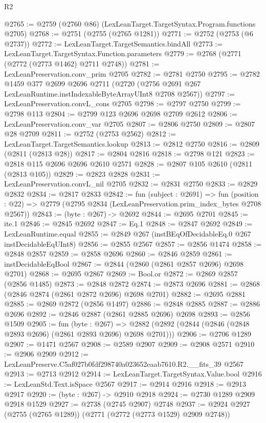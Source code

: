 \begin{lexlean}{R2}
\begin{coremodule}
@2765 := @2759 (@2760 @86) (LexLeanTarget.TargetSyntax.Program.functions @2705)
@2768 := @2751 (@2755 (@2765 @1281))
@2771 := @2752 (@2753 (@6 @2737))
@2772 := LexLeanTarget.TargetSemantics.bindAll
@2773 := LexLeanTarget.TargetSyntax.Function.parameters
@2779 := @2768 (@2771 (@2772 (@2773 @1462) @2711 @2748))
@2781 := LexLeanPreservation.conv_prim @2705
@2782 := @2781 @2750
@2795 := @2782
    @1459
    @377
    @2699
    @2696
    @2711
    (@2720 (@2756 @2691 @267 LexLeanRuntime.instIndexableByteArrayUInt8 @2708 @2567))
@2797 := LexLeanPreservation.convL_cons @2705
@2798 := @2797 @2750
@2799 := @2798 @113
@2804 := @2799 @123 @2696 @2698 @2709 @2612
@2806 := LexLeanPreservation.conv_var @2705
@2807 := @2806 @2750
@2809 := @2807 @28 @2709
@2811 := @2752 (@2753 @2562)
@2812 := LexLeanTarget.TargetSemantics.lookup
@2813 := @2812 @2750
@2816 := @2809 (@2811 (@2813 @28))
@2817 := @2804 @2816
@2818 := @2798 @121
@2823 := @2818 @115 @2696 @2696 @2610 @2571
@2828 := @2807 @105 @2610 (@2811 (@2813 @105))
@2829 := @2823 @2828
@2831 := LexLeanPreservation.convL_nil @2705
@2832 := @2831 @2750
@2833 := @2829 @2832
@2834 := @2817 @2833
@2842 := fun (subject : @2691) =>
  fun (position : @22) => @2779 (@2795 @2834 (LexLeanPreservation.prim_index_bytes @2708 @2567))
@2843 := (byte : @267) -> @2692
@2844 := @2695 @2701
@2845 := ite.{1}
@2846 := @2845 @2692
@2847 := Eq.{1}
@2848 := @2847 @2692
@2849 := LexLeanRuntime.equal
@2855 := @2849 @267 (instBEqOfDecidableEq.{0} @267 instDecidableEqUInt8)
@2856 := @2855 @2567
@2857 := @2856 @1474
@2858 := @2848 @2857
@2859 := @2858 @2696
@2860 := @2846 @2859
@2861 := instDecidableEqBool
@2867 := @2844 (@2860 (@2861 @2857 @2696) @2698 @2701)
@2868 := @2695 @2867
@2869 := Bool.or
@2872 := @2869 @2857 (@2856 @1485)
@2873 := @2848 @2872
@2874 := @2873 @2696
@2881 := @2868 (@2846 @2874 (@2861 @2872 @2696) @2698 @2701)
@2882 := @2695 @2881
@2885 := @2869 @2872 (@2856 @1497)
@2886 := @2848 @2885
@2887 := @2886 @2696
@2892 := @2846 @2887 (@2861 @2885 @2696) @2698
@2893 := @2856 @1509
@2905 := fun (byte : @267) =>
  @2882 (@2892 (@2844 (@2846 (@2848 @2893 @2696) (@2861 @2893 @2696) @2698 @2701)))
@2906 := @2706 @1289
@2907 := @1471 @2567
@2908 := @2589 @2907
@2909 := @2908 @2571
@2910 := @2906 @2909
@2912 := LexLeanPreserve.C5af027b0fdf298740a023652eaab7610.R2.__fits_39 @2567
@2913 := @2713 @2912
@2914 := LexLeanTarget.TargetSyntax.Value.bool
@2916 := LexLeanStd.Text.isSpace @2567
@2917 := @2914 @2916
@2918 := @2913 @2917
@2920 := (byte : @267) -> @2910 @2918
@2924 := @2730 @1289 @2909 @2918 @1529
@2927 := @2738 (@2745 @2907) @2748
@2937 := @2924 @2927 (@2755 (@2765 @1289)) (@2771 (@2772 (@2773 @1529) @2909 @2748))

\end{coremodule}
\end{lexlean}
